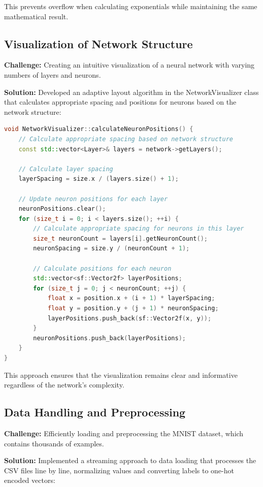 \documentclass[12pt]{article}
\begin{document}
This prevents overflow when calculating exponentials while maintaining the same mathematical result.

\subsection{Visualization of Network Structure}

\textbf{Challenge:} Creating an intuitive visualization of a neural network with varying numbers of layers and neurons.

\textbf{Solution:} Developed an adaptive layout algorithm in the NetworkVisualizer class that calculates appropriate spacing and positions for neurons based on the network structure:

\begin{lstlisting}[language=C++]
void NetworkVisualizer::calculateNeuronPositions() {
    // Calculate appropriate spacing based on network structure
    const std::vector<Layer>& layers = network->getLayers();
    
    // Calculate layer spacing
    layerSpacing = size.x / (layers.size() + 1);
    
    // Update neuron positions for each layer
    neuronPositions.clear();
    for (size_t i = 0; i < layers.size(); ++i) {
        // Calculate appropriate spacing for neurons in this layer
        size_t neuronCount = layers[i].getNeuronCount();
        neuronSpacing = size.y / (neuronCount + 1);
        
        // Calculate positions for each neuron
        std::vector<sf::Vector2f> layerPositions;
        for (size_t j = 0; j < neuronCount; ++j) {
            float x = position.x + (i + 1) * layerSpacing;
            float y = position.y + (j + 1) * neuronSpacing;
            layerPositions.push_back(sf::Vector2f(x, y));
        }
        neuronPositions.push_back(layerPositions);
    }
}
\end{lstlisting}

This approach ensures that the visualization remains clear and informative regardless of the network's complexity.

\subsection{Data Handling and Preprocessing}

\textbf{Challenge:} Efficiently loading and preprocessing the MNIST dataset, which contains thousands of examples.

\textbf{Solution:} Implemented a streaming approach to data loading that processes the CSV files line by line, normalizing values and converting labels to one-hot encoded vectors:
\end{document}

